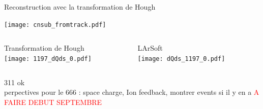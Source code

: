     \begin{frame}{Reconstruction avec la transformation de Hough}
        \begin{scriptsize}
            \begin{center} \texttt{[image: cnsub\_fromtrack.pdf]} \end{center}
            \begin{columns}
                \begin{column}{0.6\textwidth}
                    Transformation de Hough\\
                    \texttt{[image: 1197\_dQds\_0.pdf]}
                \end{column}
                \begin{column}{0.4\textwidth}
                    LArSoft\\
                    \texttt{[image: dQds\_1197\_0.pdf]}
                \end{column}
            \end{columns}
        \end{scriptsize}
    \end{frame}

    \begin{specialframe}
        \vspace{2cm}\hspace*{-1.8cm}\parbox[t]{\textwidth}{
            311 ok \\
            perpectives pour le 666 : space charge, Ion feedback, montrer events si il y en a
            \textcolor{red}{A FAIRE DEBUT SEPTEMBRE}
        }
    \end{specialframe}
    

